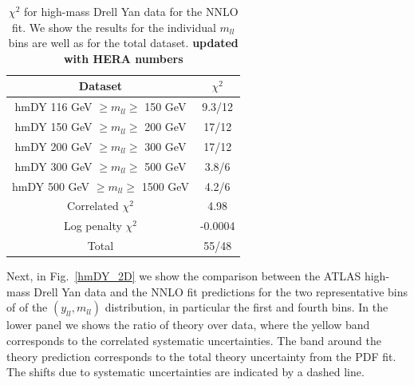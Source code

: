 \begin{table}[h]
  \centering
  \begin{tabular}{|c|c|}
    \hline
    Dataset  &   $\chi^2$ \\
    \hline
    \hline
    hmDY  116 GeV $\ge m_{ll} \ge $ 150 GeV  &  9.3/12 \\
    hmDY  150 GeV $\ge m_{ll} \ge $ 200 GeV  &  17/12 \\
    hmDY  200 GeV $\ge m_{ll} \ge $ 300 GeV  &  17/12 \\
    hmDY  300 GeV $\ge m_{ll} \ge $ 500 GeV  &  3.8/6 \\
    hmDY  500 GeV $\ge m_{ll} \ge $ 1500 GeV  &  4.2/6 \\
    \hline
    Correlated $\chi^2$ & 4.98 \\
    Log penalty $\chi^2$  & -0.0004 \\
    \hline
    \hline
    Total  & 55/48 \\
    \hline
    \end{tabular}
  \caption{$\chi^{2}$ for high-mass Drell Yan data for the NNLO fit.
    We show the results for the individual $m_{ll}$ bins
    are well as for the total dataset. {\bf updated
    with HERA numbers}
\label{tab:chi2fit}
  }
\end{table}

Next, in Fig.~\ref{hmDY_2D} we show the
comparison between the ATLAS high-mass Drell Yan data and the NNLO fit predictions
for the  two representative bins of of the $(y_{ll},m_{ll})$ distribution,
  in particular the first and fourth bins.
%
In the lower panel we shows the ratio of theory over data, where the yellow band
corresponds to the correlated systematic uncertainties.
%
The band around the theory prediction corresponds to the total
theory uncertainty from the PDF fit.
%
The shifts due to systematic uncertainties are indicated by a dashed line.

